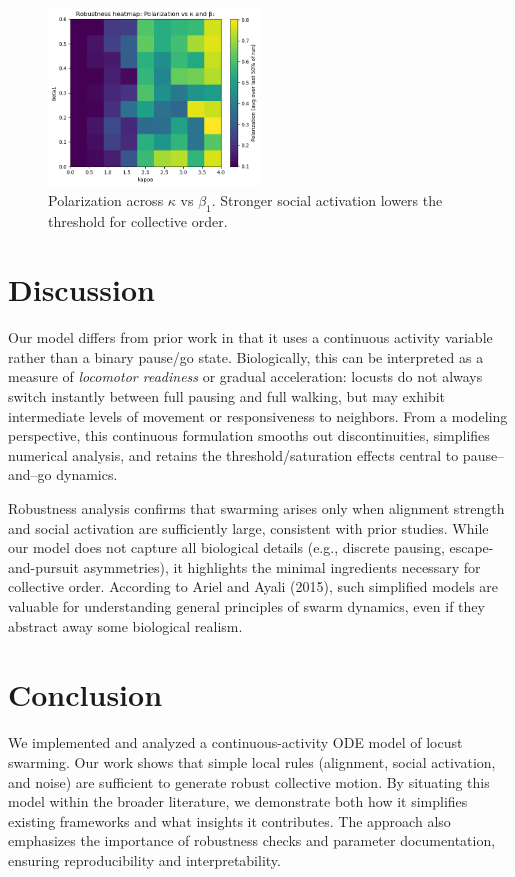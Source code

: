 \documentclass[11pt,a4paper]{article}
\begin{document}
\begin{figure}[H]
    \centering
    \includegraphics[width=0.5\textwidth]{k_vs_b1.png}
    \caption{Polarization across $\kappa$ vs $\beta_1$. Stronger social activation lowers the threshold for collective order.}
    \label{fig:scan2}
\end{figure}

\section{Discussion}

Our model differs from prior work in that it uses a continuous activity variable rather than a binary pause/go state. Biologically, this can be interpreted as a measure of \emph{locomotor readiness} or gradual acceleration: locusts do not always switch instantly between full pausing and full walking, but may exhibit intermediate levels of movement or responsiveness to neighbors. From a modeling perspective, this continuous formulation smooths out discontinuities, simplifies numerical analysis, and retains the threshold/saturation effects central to pause–and–go dynamics.  

Robustness analysis confirms that swarming arises only when alignment strength and social activation are sufficiently large, consistent with prior studies. While our model does not capture all biological details (e.g., discrete pausing, escape-and-pursuit asymmetries), it highlights the minimal ingredients necessary for collective order. According to Ariel and Ayali (2015), such simplified models are valuable for understanding general principles of swarm dynamics, even if they abstract away some biological realism.

\section{Conclusion}

We implemented and analyzed a continuous-activity ODE model of locust swarming. Our work shows that simple local rules (alignment, social activation, and noise) are sufficient to generate robust collective motion. By situating this model within the broader literature, we demonstrate both how it simplifies existing frameworks and what insights it contributes. The approach also emphasizes the importance of robustness checks and parameter documentation, ensuring reproducibility and interpretability.
\end{document}
